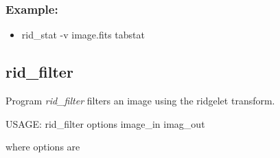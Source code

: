 \subsubsection*{Example:}
\begin{itemize}
\item rid\_stat -v  image.fits tabstat\\
\end{itemize}

\subsection{rid\_filter}

Program {\em rid\_filter} filters an image using the ridgelet transform.
\begin{center}
 USAGE:  rid\_filter options image\_in imag\_out
\end{center}
where options are 
